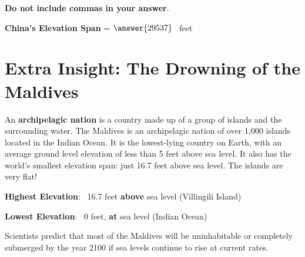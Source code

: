 \documentclass{ximera}[font=12pt]
\begin{document}
\begin{problem}
\begin{multipleChoice}
\end{multipleChoice}


\textbf{Do not include commas in your answer}.

\textcolor{orange!80!black}{\textbf{China's Elevation Span}} =  $\answer{29537}$ \ feet

\end{problem}


\section*{Extra Insight: The Drowning of the Maldives}

\normalsize
An \textbf{archipelagic nation} is a country made up of a group of islands and the surrounding water.  The Maldives 
is an archipelagic nation of over 1,000 islands located in the Indian Ocean.  It is the lowest-lying country on Earth, 
with an average ground level elevation of less than 5 feet above sea level.  It also has the world's smallest elevation 
span: just 16.7 feet above sea level.  The islands are very flat!

\textbf{Highest Elevation}: \  16.7 feet \textbf{above} sea level (Villingili Island)

\textbf{Lowest Elevation}: \  0 feet, \textbf{at} sea level (Indian Ocean)


Scientists predict that most of the Maldives will be uninhabitable or completely submerged by the year 2100 if sea 
levels continue to rise at current rates.
\end{document}

